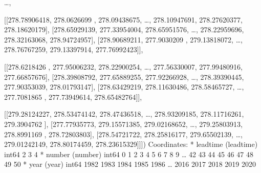 \documentclass[letterpaper,10pt,english]{sphinxmanual}
\begin{document}
{\begin{sphinxVerbatim}[commandchars=\\\{\}]
       {\ldots},

       [[278.78906418, 278.0626699 , 278.09438675, {\ldots}, 278.10947691,
         278.27620377, 278.18620179],
        [278.65929139, 277.33954004, 278.65951576, {\ldots}, 278.22959696,
         278.32163068, 278.94724957],
        [278.90689211, 277.9030209 , 279.13818072, {\ldots}, 278.76767259,
         279.13397914, 277.76992423]],

       [[278.6218426 , 277.95006232, 278.22900254, {\ldots}, 277.56330007,
         277.99480916, 277.66857676],
        [278.39808792, 277.65889255, 277.92266928, {\ldots}, 278.39390445,
         277.90353039, 278.01793147],
        [278.63429219, 278.11630486, 278.58465727, {\ldots}, 277.7081865 ,
         277.73949614, 278.65482764]],

       [[279.28124227, 278.53474142, 278.47436518, {\ldots}, 278.93209185,
         278.11716261, 279.3904762 ],
        [277.77935773, 279.15571385, 279.02168652, {\ldots}, 279.25803913,
         278.8991169 , 278.72803803],
        [278.54721722, 278.25816177, 279.65502139, {\ldots}, 279.01242149,
         278.80174459, 278.23615329]]])
Coordinates:
  * leadtime  (leadtime) int64 2 3 4
  * number    (number) int64 0 1 2 3 4 5 6 7 8 9 {\ldots} 42 43 44 45 46 47 48 49 50
  * year      (year) int64 1982 1983 1984 1985 1986 {\ldots} 2016 2017 2018 2019 2020
\end{sphinxVerbatim}
}

{
\begin{sphinxVerbatim}[commandchars=\\\{\}]
\llap{\color{nbsphinxin}[39]:\,\hspace{\fboxrule}\hspace{\fboxsep}}  
    \PYG{p}{[}\PYG{p}{]}
         
         
    \PYG{p}{[} \PYG{p}{]}
\end{sphinxVerbatim}
}
\end{document}
